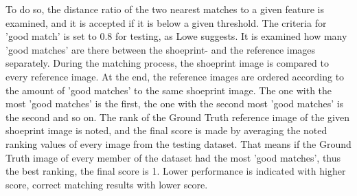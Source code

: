 \documentclass[draft,final]{vutinfth} %
\begin{document}
To do so, the distance ratio of the two nearest matches to a given feature is examined, and it is accepted if it is below a given threshold.
The criteria for 'good match' is set to 0.8 for testing, as Lowe  \cite{lowe2004distinctive} suggests.
It is examined how many 'good matches' are there between the shoeprint- and the reference images separately.
During the matching process, the shoeprint image is compared to every reference image.
At the end, the reference images are ordered according to the amount of 'good matches' to the same shoeprint image.
The one with the most 'good matches' is the first, the one with the second most 'good matches' is the second and so on.
The rank of the Ground Truth reference image of the given shoeprint image is noted, and the final score is made by averaging the noted ranking values  of every image from the testing dataset.
That means if the Ground Truth image of every member of the dataset had the most 'good matches', thus the best ranking, the final score is 1.
Lower performance is indicated with higher score, correct matching results with lower score.
\end{document}
